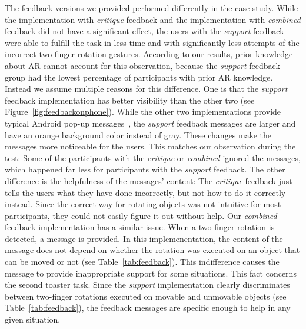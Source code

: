 \documentclass[manuscript]{acmart}
\begin{document}
			The feedback versions we provided performed differently in the case study. While the implementation with \emph{critique} feedback and the implementation with \emph{combined} feedback did not have a significant effect, the users with the \emph{support} feedback were able to fulfill the task in less time and with significantly less attempts of the incorrect two-finger rotation gestures. According to our results, prior knowledge about \ac{AR} cannot account for this observation, because the \emph{support} feedback group had the lowest percentage of participants with prior \ac{AR} knowledge. Instead we assume multiple reasons for this difference. One is that the \emph{support} feedback implementation has better visibility than the other two (see Figure~\ref{fig:feedbackonphone}). While the other two implementations provide typical Android pop-up messages~\cite{Toast2020}, the \emph{support} feedback messages are larger and have an orange background color instead of gray. These changes make the messages more noticeable for the users. This matches our observation during the test: Some of the participants with the \emph{critique} or \emph{combined} ignored the messages, which happened far less for participants with the \emph{support} feedback. The other difference is the helpfulness of the messages' content: The \emph{critique} feedback just tells the users what they have done incorrectly, but not how to do it correctly instead. Since the correct way for rotating objects was not intuitive for most participants, they could not easily figure it out without help. Our \emph{combined} feedback implementation has a similar issue. When a two-finger rotation is detected, a message is provided. In this implemenentation, the content of the message does not depend on whether the rotation was executed on an object that can be moved or not (see Table~\ref{tab:feedback}). This indifference causes the message to provide inappropriate support for some situations. This fact concerns the second toaster task. Since the \emph{support} implementation clearly discriminates between two-finger rotations executed on movable and unmovable objects (see Table~\ref{tab:feedback}), the feedback messages are specific enough to help in any given situation.
\end{document}
